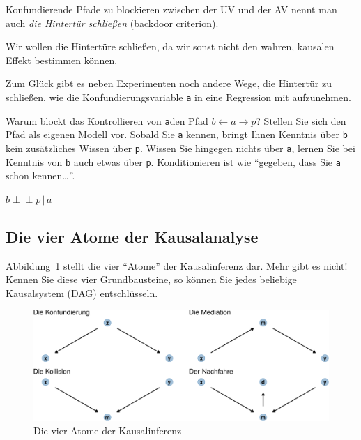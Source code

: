 \documentclass[
  a4paper,
  DIV=11]{scrreprt}
\theoremstyle{definition}
\theoremstyle{remark}
\begin{document}
Konfundierende Pfade zu blockieren zwischen der UV und der AV nennt man
auch \emph{die Hintertür schließen} (backdoor criterion).

Wir wollen die Hintertüre schließen, da wir sonst nicht den wahren,
kausalen Effekt bestimmen können.

Zum Glück gibt es neben Experimenten noch andere Wege, die Hintertür zu
schließen, wie die Konfundierungsvariable \texttt{a} in eine Regression
mit aufzunehmen.

Warum blockt das Kontrollieren von \texttt{a}den Pfad
\(b \leftarrow a \rightarrow p\)? Stellen Sie sich den Pfad als eigenen
Modell vor. Sobald Sie \texttt{a} kennen, bringt Ihnen Kenntnis über
\texttt{b} kein zusätzliches Wissen über \texttt{p}. Wissen Sie hingegen
nichts über \texttt{a}, lernen Sie bei Kenntnis von \texttt{b} auch
etwas über \texttt{p}. Konditionieren ist wie ``gegeben, dass Sie
\texttt{a} schon kennen\ldots{}''.

\(b \perp \!\!\! \perp p \,|\,a\)

\hypertarget{die-vier-atome-der-kausalanalyse}{%
\subsection{Die vier Atome der
Kausalanalyse}\label{die-vier-atome-der-kausalanalyse}}

Abbildung~\ref{fig-four-atoms} stellt die vier ``Atome'' der
Kausalinferenz dar. Mehr gibt es nicht! Kennen Sie diese vier
Grundbausteine, so können Sie jedes beliebige Kausalsystem (DAG)
entschlüsseln.

\begin{figure}

{\centering \includegraphics{./kausal_files/figure-pdf/fig-four-atoms-1.pdf}

}

\caption{\label{fig-four-atoms}Die vier Atome der Kausalinferenz}

\end{figure}
\end{document}
